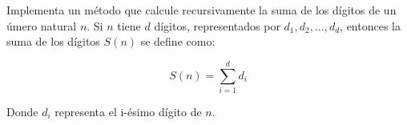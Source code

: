 Implementa un método que calcule recursivamente la suma de los dígitos de un úmero natural \( n \). Si \(n\) tiene \(d\) dígitos, representados por \(d_1, d_2, \ldots, d_d\), entonces la suma de los dígitos \(S(n)\) se define como:

$$
S(n) = \sum_{i=1}^{d} d_i
$$

Donde \(d_i\) representa el i-ésimo dígito de \(n\).
